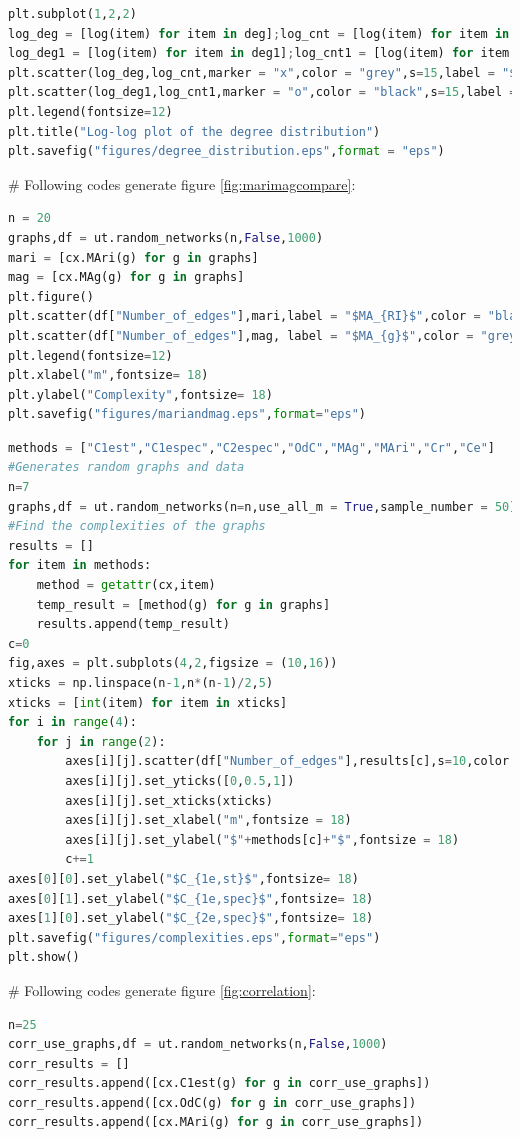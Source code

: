 \documentclass[12pt]{article}
\begin{document}
{\begin{lstlisting}[breaklines=true,language=Python]
plt.subplot(1,2,2)
log_deg = [log(item) for item in deg];log_cnt = [log(item) for item in cnt]
log_deg1 = [log(item) for item in deg1];log_cnt1 = [log(item) for item in cnt1]
plt.scatter(log_deg,log_cnt,marker = "x",color = "grey",s=15,label = "$G(n,m) model$")
plt.scatter(log_deg1,log_cnt1,marker = "o",color = "black",s=15,label = "Barabasi-Albert model")
plt.legend(fontsize=12)
plt.title("Log-log plot of the degree distribution")
plt.savefig("figures/degree_distribution.eps",format = "eps")
\end{lstlisting}
\noindent
\newline
\# Following codes generate figure \ref{fig:marimagcompare}:
\begin{lstlisting}[breaklines=true,language=Python]
n = 20
graphs,df = ut.random_networks(n,False,1000)
mari = [cx.MAri(g) for g in graphs]
mag = [cx.MAg(g) for g in graphs]
plt.figure()
plt.scatter(df["Number_of_edges"],mari,label = "$MA_{RI}$",color = "black",marker = "o",s=10)
plt.scatter(df["Number_of_edges"],mag, label = "$MA_{g}$",color = "grey",marker = "x",s=10)
plt.legend(fontsize=12)
plt.xlabel("m",fontsize= 18)
plt.ylabel("Complexity",fontsize= 18)
plt.savefig("figures/mariandmag.eps",format="eps")
\end{lstlisting}
\begin{lstlisting}[breaklines=true,language=Python]
methods = ["C1est","C1espec","C2espec","OdC","MAg","MAri","Cr","Ce"]
#Generates random graphs and data
n=7
graphs,df = ut.random_networks(n=n,use_all_m = True,sample_number = 50)
#Find the complexities of the graphs
results = []
for item in methods:
    method = getattr(cx,item)
    temp_result = [method(g) for g in graphs]
    results.append(temp_result)
c=0
fig,axes = plt.subplots(4,2,figsize = (10,16))
xticks = np.linspace(n-1,n*(n-1)/2,5)
xticks = [int(item) for item in xticks]
for i in range(4):
    for j in range(2):
        axes[i][j].scatter(df["Number_of_edges"],results[c],s=10,color = "black")
        axes[i][j].set_yticks([0,0.5,1])
        axes[i][j].set_xticks(xticks)
        axes[i][j].set_xlabel("m",fontsize = 18)
        axes[i][j].set_ylabel("$"+methods[c]+"$",fontsize = 18)
        c+=1
axes[0][0].set_ylabel("$C_{1e,st}$",fontsize= 18)
axes[0][1].set_ylabel("$C_{1e,spec}$",fontsize= 18)
axes[1][0].set_ylabel("$C_{2e,spec}$",fontsize= 18)
plt.savefig("figures/complexities.eps",format="eps")
plt.show()


\end{lstlisting}
\noindent
\newline
\# Following codes generate figure \ref{fig:correlation}:
\begin{lstlisting}[breaklines=true,language=Python]
n=25
corr_use_graphs,df = ut.random_networks(n,False,1000)
corr_results = []
corr_results.append([cx.C1est(g) for g in corr_use_graphs])
corr_results.append([cx.OdC(g) for g in corr_use_graphs])
corr_results.append([cx.MAri(g) for g in corr_use_graphs])


\end{lstlisting}}
\end{document}
